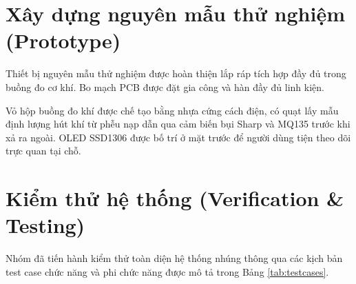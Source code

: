 \section{Xây dựng nguyên mẫu thử nghiệm (Prototype)}
Thiết bị nguyên mẫu thử nghiệm được hoàn thiện lắp ráp tích hợp đầy đủ trong buồng đo cơ khí. Bo mạch PCB được đặt gia công và hàn đầy đủ linh kiện.

Vỏ hộp buồng đo khí được chế tạo bằng nhựa cứng cách điện, có quạt lấy mẫu định lượng hút khí từ phễu nạp dẫn qua cảm biến bụi Sharp và MQ135 trước khi xả ra ngoài. OLED SSD1306 được bố trí ở mặt trước để người dùng tiện theo dõi trực quan tại chỗ.

\section{Kiểm thử hệ thống (Verification \& Testing)}
Nhóm đã tiến hành kiểm thử toàn diện hệ thống nhúng thông qua các kịch bản test case chức năng và phi chức năng được mô tả trong Bảng \ref{tab:testcases}.

